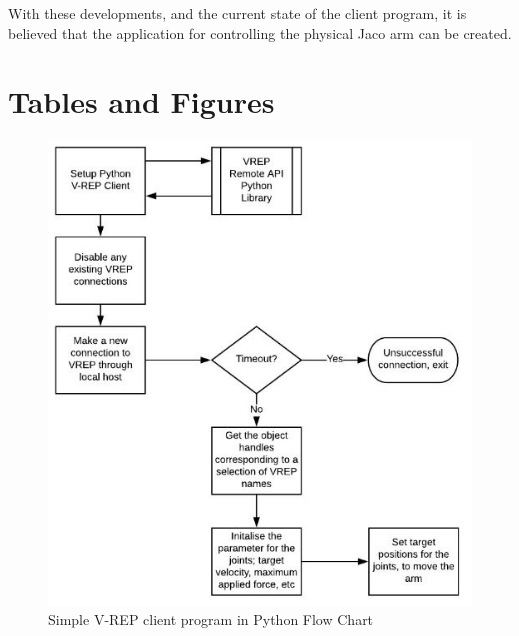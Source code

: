 \documentclass[12pt,openany,a4paper]{book}
\begin{document}
With these developments, and the current state of the client program, it is believed that the application for controlling the physical Jaco arm can be created.


\appendix


{}
\mbox{}
\newpage



\chapter{Tables and Figures}

\begin{center}
\begin{figure}[htb]
  \includegraphics[width=0.8\linewidth]{python_flow_diagram.jpg}
\caption{Simple V-REP client program in Python Flow Chart}
\end{figure}
\end{center}
\end{document}
